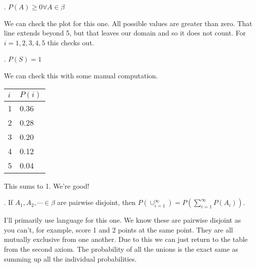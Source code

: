 . $P(A) \geq 0 \forall A \in \beta$

We can check the plot for this one. All possible values are greater than zero. That line extends beyond 5, but that leaves our domain and so it does not count. For $i = 1, 2, 3, 4, 5$ this checks out.

. $P(S) = 1$

We can check this with some manual computation.

\begin{table}[h]
\begin{tabular}{|l|l|}
\hline
$i$ & $P(i)$ \\ \hline
1   & 0.36   \\ \hline
2   & 0.28   \\ \hline
3   & 0.20   \\ \hline
4   & 0.12   \\ \hline
5   & 0.04   \\ \hline
\end{tabular}
\end{table}

This sums to 1. We're good!

. If $A_1, A_2, \cdots \in \beta$ are pairwise disjoint, then $P(\cup_{i=1}^{\infty}) = P(\sum_{i=1}^{\infty} P(A_i))$.

I'll primarily use language for this one. We know these are pairwise disjoint as you can't, for example, score 1 and 2 points at the same point. They are all mutually exclusive from one another. Due to this we can just return to the table from the second axiom. The probability of all the unions is the exact same as summing up all the individual probabilities. 
